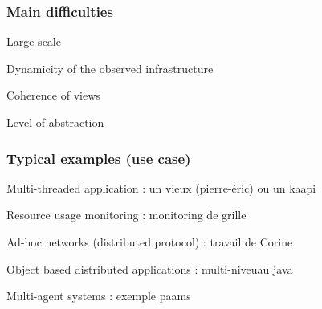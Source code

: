 \begin{frame}
\frametitle{Main difficulties}
\begin{description}
\item Large scale
\item Dynamicity of the observed infrastructure
\item Coherence of views
\item Level of abstraction
\end{description}
\end{frame}

\begin{frame}
\frametitle{Typical examples (use case)}
\begin{description}
\item Multi-threaded application : un vieux (pierre-éric) ou un kaapi 
\item Resource usage monitoring : monitoring de grille 
\item Ad-hoc networks (distributed protocol) : travail de Corine
\item 
\item Object based distributed applications : multi-niveuau java
\item Multi-agent systems : exemple paams
\end{description}
\end{frame}
